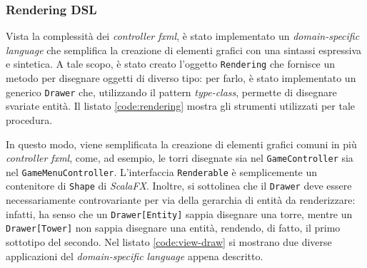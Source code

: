 \subsubsection{Rendering DSL}
Vista la complessità dei \textit{controller fxml}, è stato implementato un \textit{domain-specific language} che
semplifica la creazione di elementi grafici con una sintassi espressiva e sintetica. A tale scopo, è stato creato
l'oggetto \texttt{Rendering} che fornisce un metodo per disegnare oggetti di diverso tipo: per farlo, è stato
implementato un generico \texttt{Drawer} che, utilizzando il pattern \textit{type-class}, permette di
disegnare svariate entità. Il listato \ref{code:rendering} mostra gli strumenti utilizzati per tale procedura.



In questo modo, viene semplificata la creazione di elementi grafici comuni in più \textit{controller fxml}, come, ad
esempio, le torri disegnate sia nel \texttt{GameController} sia nel \texttt{GameMenuController}. L'interfaccia
\texttt{Renderable} è semplicemente un contenitore di \texttt{Shape} di \textit{ScalaFX}. Inoltre, si sottolinea che il
\texttt{Drawer} deve essere necessariamente controvariante per via della gerarchia di entità da renderizzare: infatti,
ha senso che un \texttt{Drawer[Entity]} sappia disegnare una torre, mentre un \texttt{Drawer[Tower]} non sappia
disegnare una entità, rendendo, di fatto, il primo sottotipo del secondo. Nel listato \ref{code:view-draw} si mostrano
due diverse applicazioni del \textit{domain-specific language} appena descritto.




